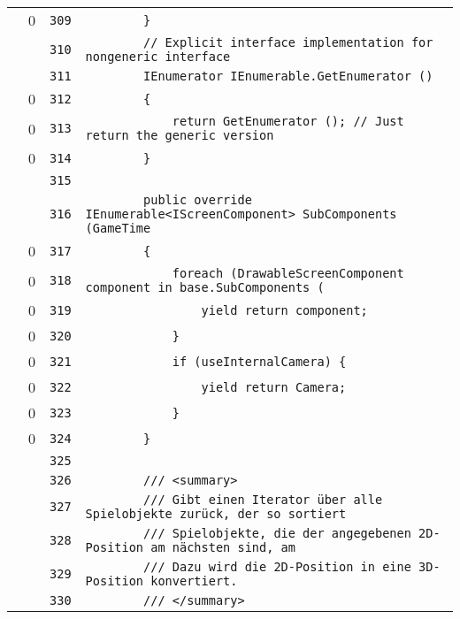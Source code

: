 \documentclass[a4paper,10pt]{article}
\begin{document}
\begin{longtable}[l]{lrrl}
\cellcolor{red} & 0 & \verb~309~ & \verb~        }~\\
\cellcolor{gray} &  & \verb~310~ & \verb~        // Explicit interface implementation for nongeneric interface~\\
\cellcolor{gray} &  & \verb~311~ & \verb~        IEnumerator IEnumerable.GetEnumerator ()~\\
\cellcolor{red} & 0 & \verb~312~ & \verb~        {~\\
\cellcolor{red} & 0 & \verb~313~ & \verb~            return GetEnumerator (); // Just return the generic version~\\
\cellcolor{red} & 0 & \verb~314~ & \verb~        }~\\
\cellcolor{gray} &  & \verb~315~ & \verb~~\\
\cellcolor{gray} &  & \verb~316~ & \verb~        public override IEnumerable<IScreenComponent> SubComponents (GameTime ~\\
\cellcolor{red} & 0 & \verb~317~ & \verb~        {~\\
\cellcolor{red} & 0 & \verb~318~ & \verb~            foreach (DrawableScreenComponent component in base.SubComponents (~\\
\cellcolor{red} & 0 & \verb~319~ & \verb~                yield return component;~\\
\cellcolor{red} & 0 & \verb~320~ & \verb~            }~\\
\cellcolor{red} & 0 & \verb~321~ & \verb~            if (useInternalCamera) {~\\
\cellcolor{red} & 0 & \verb~322~ & \verb~                yield return Camera;~\\
\cellcolor{red} & 0 & \verb~323~ & \verb~            }~\\
\cellcolor{red} & 0 & \verb~324~ & \verb~        }~\\
\cellcolor{gray} &  & \verb~325~ & \verb~~\\
\cellcolor{gray} &  & \verb~326~ & \verb~        /// <summary>~\\
\cellcolor{gray} &  & \verb~327~ & \verb~        /// Gibt einen Iterator über alle Spielobjekte zurück, der so sortiert~\\
\cellcolor{gray} &  & \verb~328~ & \verb~        /// Spielobjekte, die der angegebenen 2D-Position am nächsten sind, am~\\
\cellcolor{gray} &  & \verb~329~ & \verb~        /// Dazu wird die 2D-Position in eine 3D-Position konvertiert.~\\
\cellcolor{gray} &  & \verb~330~ & \verb~        /// </summary>~\\

\end{longtable}
\end{document}

